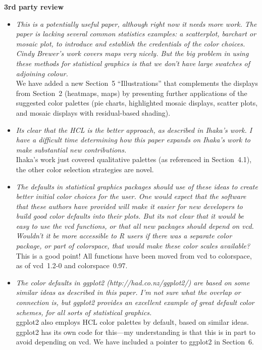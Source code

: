 \documentclass{wuletter}
\begin{document}
\textbf{3rd party review}

\begin{itemize}
  \item \textit{This is a potentially useful paper, although right now it needs more
        work.  The paper is lacking several common statistics examples: a
        scatterplot, barchart or mosaic plot, to introduce and establish the
        credentials of the color choices. Cindy Brewer's work covers maps very
        nicely. But the big problem in using these methods for statistical
        graphics is that we don't have large swatches of adjoining colour.}\\[-0.3cm]
	
	We have added a new Section~5 ``Illustrations'' that complements
	the displays from Section~2 (heatmaps, maps) by presenting further
	applications of the suggested color palettes (pie charts,
	highlighted mosaic displays, scatter plots, and mosaic displays
	with residual-based shading).
	
  \item \textit{Its clear that the HCL is the better approach, as described in Ihaka's
        work. I have a difficult time determining how this paper expands on
        Ihaka's work to make substantial new contributions.}\\[-0.3cm]
	
	Ihaka's work just covered qualitative palettes (as referenced in Section~4.1),
	the other color selection strategies are novel.

  \item \textit{The defaults in statistical graphics packages should use of these
        ideas to create better initial color choices for the user. One would
        expect that the software that these authors have provided will make it
        easier for new developers to build good color defaults into their
        plots. But its not clear that it would be easy to use the vcd
        functions, or that all new packages should depend on vcd. Wouldn't it
        be more accessible to R users if there was a separate color package,
        or part of colorspace, that would make these color scales available?}\\[-0.3cm]
	
	This is a good point! All functions have been moved from vcd to colorspace,
	as of vcd~1.2-0 and colorspace~0.97.

  \item \textit{The color defaults in ggplot2 (http://had.co.nz/ggplot2/) are based on
        some similar ideas as described in this paper. I'm not sure what the
        overlap or connection is, but ggplot2 provides an excellent example of
        great default color schemes, for all sorts of statistical graphics.}\\[-0.3cm]
	
	ggplot2 also employs HCL color palettes by default, based on similar ideas.
        ggplot2 has its own code for this---my understanding is that this is 
	in part to avoid depending on vcd. We have included a pointer to ggplot2
	in Section~6.

\end{itemize}
\end{document}
